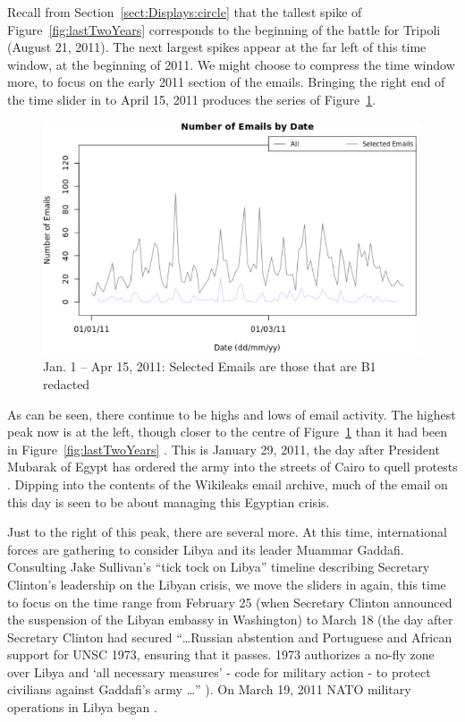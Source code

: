 \documentclass[journal]{vgtc}                %
\begin{document}
Recall from Section~\ref{sect:Displays:circle} that the tallest spike of Figure~\ref{fig:lastTwoYears} corresponds to the beginning of the battle for Tripoli (August 21, 2011).   The next largest spikes appear at the far left of this time window, at the beginning of 2011.  We might choose to compress the time window more, to focus on the early 2011 section of the emails.  Bringing the right end of the time slider in to April 15, 2011 produces the series of Figure~\ref{fig:early2011B1}.
\begin{figure}[h]
\begin{center}
\includegraphics[width=0.95\linewidth]{EmailVolumeB1JanApril2011}
\caption{Jan. 1 -- Apr 15, 2011:  Selected Emails are those that are B1 redacted}
\label{fig:early2011B1}
\end{center}
\end{figure}

As can be seen, there continue to be highs and lows of email activity.   The highest peak now is at the left, though closer to the centre of Figure~\ref{fig:early2011B1} than it had been in Figure~\ref{fig:lastTwoYears} .  This is January 29, 2011, the day after President Mubarak of Egypt has ordered the army into the streets of Cairo to quell protests \cite{cairoTanks2011, cairoResponse2011}.  Dipping into the contents of the Wikileaks email archive, much of the email on this day is seen to be about managing this Egyptian crisis.  

Just to the right of this peak, there are several more.   At this time, international forces are gathering to consider Libya and its leader Muammar Gaddafi.  Consulting Jake Sullivan's ``tick tock on Libya'' timeline describing Secretary Clinton's leadership on the Libyan crisis, we move the sliders in again, this time to focus on the time range from February 25 (when Secretary Clinton announced the suspension of the Libyan embassy in Washington) to March 18 (the day after Secretary Clinton had secured ``\ldots Russian abstention and Portuguese and African support for UNSC 1973, ensuring that  it passes. 1973 authorizes a no-fly zone over Libya and `all necessary measures' - code for military action - to protect civilians against Gaddafi's army \ldots'' \cite{tickTockLibya}).  On March 19, 2011 NATO military operations in Libya began \cite{LibyaTimelineWiki}.
\end{document}
